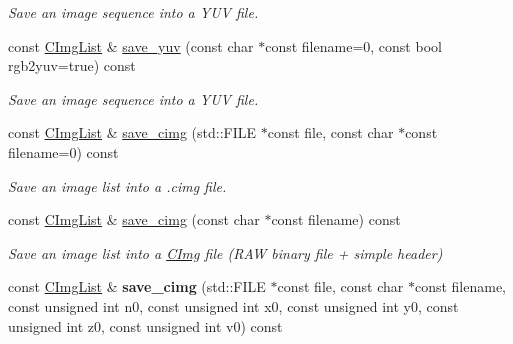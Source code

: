 \begin{DoxyCompactItemize}
\begin{DoxyCompactList}\small\item\em Save an image sequence into a Y\-U\-V file. \end{DoxyCompactList}\item 
\hypertarget{structcimg__library_1_1_c_img_list_a4d22cc80edc4692865409efc38ac406d}{const \hyperlink{structcimg__library_1_1_c_img_list}{C\-Img\-List} \& \hyperlink{structcimg__library_1_1_c_img_list_a4d22cc80edc4692865409efc38ac406d}{save\-\_\-yuv} (const char $\ast$const filename=0, const bool rgb2yuv=true) const }\label{structcimg__library_1_1_c_img_list_a4d22cc80edc4692865409efc38ac406d}

\begin{DoxyCompactList}\small\item\em Save an image sequence into a Y\-U\-V file. \end{DoxyCompactList}\item 
const \hyperlink{structcimg__library_1_1_c_img_list}{C\-Img\-List} \& \hyperlink{structcimg__library_1_1_c_img_list_af0a1d766b2ad5acff467cddb8d108475}{save\-\_\-cimg} (std\-::\-F\-I\-L\-E $\ast$const file, const char $\ast$const filename=0) const 
\begin{DoxyCompactList}\small\item\em Save an image list into a .cimg file. \end{DoxyCompactList}\item 
\hypertarget{structcimg__library_1_1_c_img_list_a9401ecac7b6ea3c3c42038e7bb2b3ff5}{const \hyperlink{structcimg__library_1_1_c_img_list}{C\-Img\-List} \& \hyperlink{structcimg__library_1_1_c_img_list_a9401ecac7b6ea3c3c42038e7bb2b3ff5}{save\-\_\-cimg} (const char $\ast$const filename) const }\label{structcimg__library_1_1_c_img_list_a9401ecac7b6ea3c3c42038e7bb2b3ff5}

\begin{DoxyCompactList}\small\item\em Save an image list into a \hyperlink{structcimg__library_1_1_c_img}{C\-Img} file (R\-A\-W binary file + simple header) \end{DoxyCompactList}\item 
\hypertarget{structcimg__library_1_1_c_img_list_a7367dfe7cf1b1f6cab33d4783bdc388f}{const \hyperlink{structcimg__library_1_1_c_img_list}{C\-Img\-List} \& {\bfseries save\-\_\-cimg} (std\-::\-F\-I\-L\-E $\ast$const file, const char $\ast$const filename, const unsigned int n0, const unsigned int x0, const unsigned int y0, const unsigned int z0, const unsigned int v0) const }\label{structcimg__library_1_1_c_img_list_a7367dfe7cf1b1f6cab33d4783bdc388f}


\end{DoxyCompactItemize}

